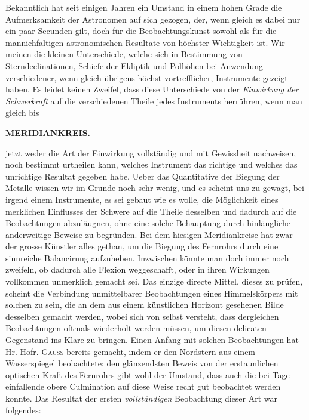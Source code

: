 Bekanntlich hat seit einigen Jahren ein Umstand in einem hohen Grade die Aufmerksamkeit der
Astronomen auf sich gezogen, der, wenn gleich es dabei nur ein paar Secunden gilt, doch für die
Beobachtungskunst sowohl als für die mannichfaltigen astronomischen Resultate von höchster
Wichtigkeit ist. Wir meinen die kleinen Unterschiede, welche sich in Bestimmung von
Sterndeclinationen, Schiefe der Ekliptik und Polhöhen bei Anwendung verschiedener, wenn gleich
übrigens höchst vortrefflicher, Instrumente gezeigt haben. Es leidet keinen Zweifel, dass diese
Unterschiede von der \emph{Einwirkung der Schwerkraft} auf die verschiedenen Theile jedes
Instruments herrühren, wenn man gleich bis\par
\clearpage
\noindent{}%
%
\parbox[t]{\dimexpr\linewidth-24mm\relax}{\centering\footnotesize\bfseries MERIDIANKREIS.\par}%
\makebox[12mm][r]{}\par\nobreak\medskip
\noindent jetzt weder die Art der Einwirkung vollständig und mit Gewissheit nachweisen, noch bestimmt
urtheilen kann, welches Instrument das richtige und welches das unrichtige Resultat gegeben habe.
Ueber das Quantitative der Biegung der Metalle wissen wir im Grunde noch sehr wenig, und es scheint
uns zu gewagt, bei irgend einem Instrumente, es sei gebaut wie es wolle, die Möglichkeit eines
merklichen Einflusses der Schwere auf die Theile desselben und dadurch auf die Beobachtungen
abzuläugnen, ohne eine solche Behauptung durch hinlängliche anderweitige Beweise zu begründen. Bei
dem hiesigen Meridiankreise hat zwar der grosse Künstler alles gethan, um die Biegung des Fernrohrs
durch eine sinnreiche Balancirung aufzuheben. Inzwischen könnte man doch immer noch zweifeln, ob
dadurch alle Flexion weggeschafft, oder in ihren Wirkungen vollkommen unmerklich gemacht sei. Das
einzige directe Mittel, dieses zu prüfen, scheint die Verbindung unmittelbarer Beobachtungen eines
Himmelskörpers mit solchen zu sein, die an dem aus einem künstlichen Horizont gesehenen Bilde
desselben gemacht werden, wobei sich von selbst versteht, dass dergleichen Beobachtungen oftmals
wiederholt werden müssen, um diesen delicaten Gegenstand ins Klare zu bringen. Einen Anfang mit
solchen Beobachtungen hat Hr. Hofr. \textsc{Gauss} bereits gemacht, indem er den Nordstern aus
einem Wasserspiegel beobachtete: den glänzendsten Beweis von der erstaunlichen optischen Kraft des
Fernrohrs gibt wohl der Umstand, dass auch die bei Tage einfallende obere Culmination auf diese
Weise recht gut beobachtet werden konnte. Das Resultat der ersten \textit{vollständigen}
Beobachtung dieser Art war folgendes:

